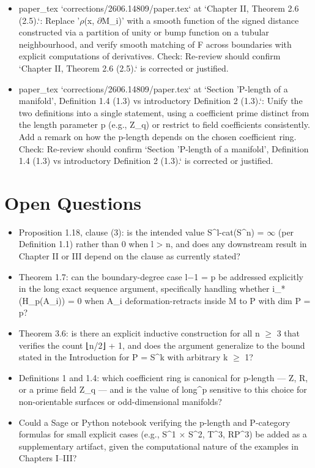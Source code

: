 \documentclass[11pt]{article}
\begin{document}
\begin{itemize}[leftmargin=*]
  \item [open] paper\_tex `corrections/2606.14809/paper.tex` at `Chapter II, Theorem 2.6 (2.5).`: Replace '\ensuremath{\rho}(x, \ensuremath{\partial}M\_i)' with a smooth function of the signed distance constructed via a partition of unity or bump function on a tubular neighbourhood, and verify smooth matching of F across boundaries with explicit computations of derivatives. Check: Re-review should confirm `Chapter II, Theorem 2.6 (2.5).` is corrected or justified.
  \item [open] paper\_tex `corrections/2606.14809/paper.tex` at `Section 'P-length of a manifold', Definition 1.4 (1.3) vs introductory Definition 2 (1.3).`: Unify the two definitions into a single statement, using a coefficient prime distinct from the length parameter p (e.g., Z\_q) or restrict to field coefficients consistently. Add a remark on how the p-length depends on the chosen coefficient ring. Check: Re-review should confirm `Section 'P-length of a manifold', Definition 1.4 (1.3) vs introductory Definition 2 (1.3).` is corrected or justified.
\end{itemize}

\section*{Open Questions}
\begin{itemize}[leftmargin=*]
  \item Proposition 1.18, clause (3): is the intended value S\^{}l-cat(S\^{}n) = \ensuremath{\infty} (per Definition 1.1) rather than 0 when l > n, and does any downstream result in Chapter II or III depend on the clause as currently stated?
  \item Theorem 1.7: can the boundary-degree case l\ensuremath{-}1 = p be addressed explicitly in the long exact sequence argument, specifically handling whether i\_*(H\_p(A\_i)) = 0 when A\_i deformation-retracts inside M to P with dim P = p?
  \item Theorem 3.6: is there an explicit inductive construction for all n \ensuremath{\ge} 3 that verifies the count ⌊n/2⌋ + 1, and does the argument generalize to the bound stated in the Introduction for P = S\^{}k with arbitrary k \ensuremath{\ge} 1?
  \item Definitions 1 and 1.4: which coefficient ring is canonical for p-length --- Z, R, or a prime field Z\_q --- and is the value of long\^{}p sensitive to this choice for non-orientable surfaces or odd-dimensional manifolds?
  \item Could a Sage or Python notebook verifying the p-length and P-category formulas for small explicit cases (e.g., S\^{}1 \ensuremath{\times} S\^{}2, T\^{}3, RP\^{}3) be added as a supplementary artifact, given the computational nature of the examples in Chapters I--III?
\end{itemize}
\end{document}

